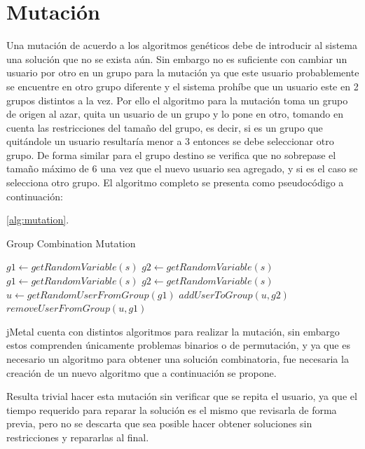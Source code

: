 \section{Mutación}

Una mutación de acuerdo a los algoritmos genéticos debe de introducir al sistema una solución que no se exista aún. Sin embargo no es suficiente con cambiar un usuario por otro en un grupo para la mutación ya que este usuario probablemente se encuentre en otro grupo diferente y el sistema prohíbe que un usuario este en 2 grupos distintos a la vez. Por ello el algoritmo para la mutación toma un grupo de origen al azar, quita un usuario de un grupo y lo pone en otro, tomando en cuenta las restricciones del tamaño del grupo, es decir, si es un grupo que quitándole un usuario resultaría menor a 3 entonces se debe seleccionar otro grupo. De forma similar para el grupo destino se verifica que no sobrepase el tamaño máximo de 6 una vez que el nuevo usuario sea agregado, y si es el caso se selecciona otro grupo. El algoritmo completo se presenta como pseudocódigo a continuación:

\ref{alg:mutation}.
\begin{algorithm}
\caption{Group Combination Mutation}\label{alg:mutation}
\begin{algorithmic}[1]
\State $g1\gets getRandomVariable(s)$
\State $g2\gets getRandomVariable(s)$
\State $g1 \gets getRandomVariable(s)$
\EndWhile\label{euclidendwhile}
\State $g2 \gets getRandomVariable(s)$
\EndWhile\label{euclidendwhile}
\State $u \gets getRandomUserFromGroup(g1)$ 
\State $addUserToGroup(u,g2)$
\State $removeUserFromGroup(u,g1)$
\EndProcedure
\end{algorithmic}
\end{algorithm}

jMetal cuenta con distintos algoritmos para realizar la mutación, sin embargo estos comprenden únicamente problemas binarios o de permutación, y ya que es necesario un algoritmo para obtener una solución combinatoria, fue necesaria la creación de un nuevo algoritmo que a continuación se propone.

Resulta trivial hacer esta mutación sin verificar que se repita el usuario, ya que el tiempo requerido para reparar la solución es el mismo que revisarla de forma previa, pero no se descarta que sea posible hacer obtener soluciones sin restricciones y repararlas al final.

